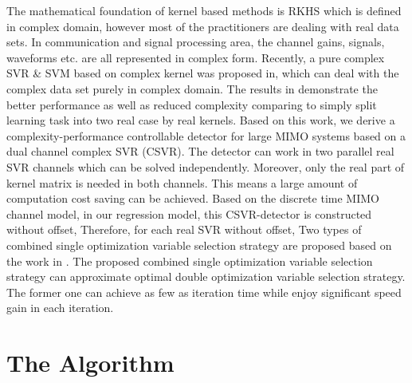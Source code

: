The mathematical foundation of kernel based methods is RKHS which is defined in complex domain, however most of the practitioners are dealing with real data sets. In communication and signal processing area, the channel gains, signals, waveforms etc. are all represented in complex form. Recently, a pure complex SVR \& SVM based on complex kernel was proposed in\cite{bouboulis2013complex}, which can deal with the complex data set purely in complex domain. The results in\cite{bouboulis2013complex} demonstrate the better performance as well as reduced complexity comparing to simply split learning task into two real case by real kernels.  
Based on this work, we derive a complexity-performance controllable detector for large MIMO systems based on a dual channel complex SVR (CSVR). The detector can work in two parallel real SVR channels which can be solved independently. Moreover, only the real part of kernel matrix is needed in both channels. This means a large amount of computation cost saving can be achieved.
Based on the discrete time MIMO channel model, in our regression model, this CSVR-detector
is constructed without offset, Therefore, for each real SVR without offset, 
Two types of combined single optimization variable selection strategy are proposed based on the work in \cite{steinwart2011training}. The proposed combined single optimization variable selection strategy can approximate optimal double optimization variable selection strategy. The former one can achieve as few as iteration time while enjoy significant speed gain in each iteration.
\section{The Algorithm}